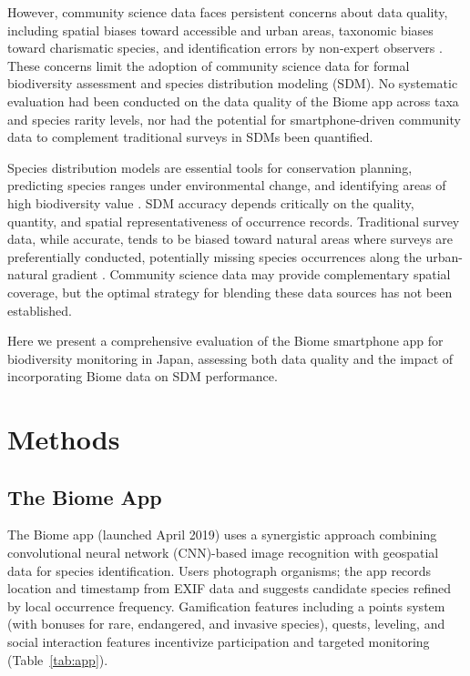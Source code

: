 \documentclass[11pt]{article}
\begin{document}
However, community science data faces persistent concerns about data quality, including spatial biases toward accessible and urban areas, taxonomic biases toward charismatic species, and identification errors by non-expert observers \citep{bird2014statistical, kosmala2016assessing}. These concerns limit the adoption of community science data for formal biodiversity assessment and species distribution modeling (SDM). No systematic evaluation had been conducted on the data quality of the Biome app across taxa and species rarity levels, nor had the potential for smartphone-driven community data to complement traditional surveys in SDMs been quantified.

Species distribution models are essential tools for conservation planning, predicting species ranges under environmental change, and identifying areas of high biodiversity value \citep{elith2009species}. SDM accuracy depends critically on the quality, quantity, and spatial representativeness of occurrence records. Traditional survey data, while accurate, tends to be biased toward natural areas where surveys are preferentially conducted, potentially missing species occurrences along the urban-natural gradient \citep{kadmon2004effect}. Community science data may provide complementary spatial coverage, but the optimal strategy for blending these data sources has not been established.

Here we present a comprehensive evaluation of the Biome smartphone app for biodiversity monitoring in Japan, assessing both data quality and the impact of incorporating Biome data on SDM performance.

\section{Methods}

\subsection{The Biome App}

The Biome app (launched April 2019) uses a synergistic approach combining convolutional neural network (CNN)-based image recognition with geospatial data for species identification. Users photograph organisms; the app records location and timestamp from EXIF data and suggests candidate species refined by local occurrence frequency. Gamification features including a points system (with bonuses for rare, endangered, and invasive species), quests, leveling, and social interaction features incentivize participation and targeted monitoring (Table~\ref{tab:app}).
\end{document}
